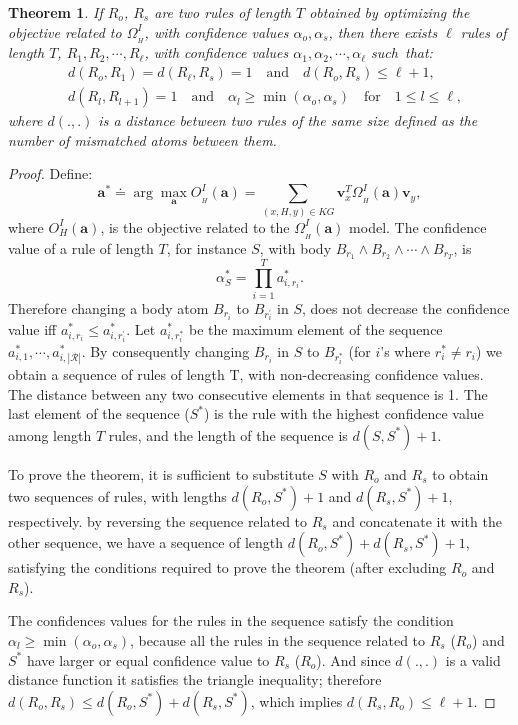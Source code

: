 \documentclass{article}
\newtheorem{theorem}{Theorem}
\newcommand{\mb}[1]{\mathbf{#1}}
\begin{document}
\renewcommand\thetheorem{1}
\begin{theorem}
\label{thr:theorem_1_appendix}
If $R_o$, $R_s$ are two rules of length $T$ obtained by optimizing the objective related to $\Omega^I_{\scriptstyle_{H}}$, with confidence values $\alpha_o, \alpha_s$, then there exists $\ell$ rules of length $T$, $R_1, R_2, \cdots, R_{\ell}$, with confidence values $\alpha_1, \alpha_2, \cdots, \alpha_{\ell}$ such~that:
\begin{align*}
    & d(R_o, R_1) =d(R_{\ell}, R_s)=1 \quad \text{and} \quad  d(R_o, R_s) \leq \ell +1, \\
    & d(R_l, R_{l+1})=1 \quad \text{and} \quad \alpha_l \geq  \min(\alpha_o, \alpha_s) \quad \text{for} \quad 1 \leq l \leq \ell,
\end{align*}
where $d(.,.)$ is a distance between two rules of the same size defined as the number of mismatched atoms between them.
\end{theorem}
\begin{proof}
Define:
\[
    \mb{a}^*\doteq \arg \max_{\mb{a}} O^I_{\scriptstyle_{H}}(\mb{a}) = 
        \sum_{(x,H,y) \in KG} \mb{v}_x^T \Omega^I_{\scriptstyle_{H}}(\mb{a}) \mb{v}_y,    
\]
where $O^I_H(\mb{a})$, is the objective related to the $\Omega^I_{\scriptstyle_{H}}(\bm{a})$ model. The confidence value of a rule of length $T$, for instance $S$, with body $B_{r_1} \land B_{r_2} \land \cdots \land B_{r_T}$, is
\[
    \alpha^*_S=\prod^{T}_{i=1} a^*_{i, r_i}.
\]
Therefore changing a body atom $B_{r_i}$ to $B_{r^{\prime}_i}$ in $S$, does not decrease the confidence value iff $a^*_{i, r_i} \leq a^*_{i, r^{\prime}_i}$. Let $a^*_{i, r^{*}_i}$ be the maximum element of the sequence $a^*_{i, 1}, \cdots, a^*_{i, |\mathcal{R}| }$. By consequently changing $B_{r_i}$ in $S$ to $B_{r^{*}_i}$ (for $i$'s where $r^{*}_i \neq r_i$) we obtain a sequence of rules of length T, with non-decreasing confidence values. The distance between any two consecutive elements in that sequence is 1. The last element of the sequence ($S^*$) is the rule with the highest confidence value among length $T$ rules, and the length of the sequence is $d(S, S^*)+1$.

To prove the theorem, it is sufficient to substitute $S$ with $R_o$ and $R_s$ to obtain two sequences of rules, with lengths $d(R_o, S^*)+1$ and $d(R_s, S^*)+1$, respectively. by reversing the sequence related to $R_s$ and concatenate it with the other sequence, we have a sequence of length $d(R_o, S^*)+d(R_s, S^*)+1$, satisfying the conditions required to prove the theorem (after excluding $R_o$ and $R_s$). 

The confidences values for the rules in the sequence satisfy the condition  $\alpha_l \geq \min(\alpha_o, \alpha_s)$, because all the rules in the sequence related to $R_s$ ($R_o$) and $S^*$ have larger or equal confidence value to $R_s$ ($R_o$). And since $d(.,.)$ is a valid distance function it satisfies the triangle inequality; therefore $d(R_o, R_s) \leq d(R_o, S^*)+d(R_s, S^*)$, which implies $d(R_s, R_o) \leq \ell +1 $.    
\end{proof}
\end{document}
